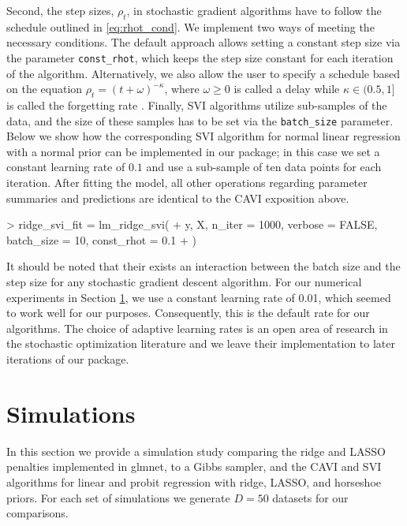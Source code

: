\documentclass[]{article}
\let\code=\texttt
\newenvironment{CodeChunk}{}{}
\newcommand{\pkg}[1]{{\fontseries{b}\selectfont #1}}
\begin{document}
Second, the step sizes, $\rho_t$, in stochastic gradient algorithms have to
follow the schedule outlined in \eqref{eq:rhot_cond}. We implement two ways of
meeting the necessary conditions. The default approach allows setting a constant
step size via the parameter \code{const\_rhot}, which keeps the step size
constant for each iteration of the algorithm. Alternatively, we also allow the
user to specify a schedule based on the equation $\rho_t = (t +
\omega)^{-\kappa}$, where $\omega \geq 0$ is called a delay while $\kappa \in
(0.5,  1]$ is called the forgetting rate \citep{hoffman2013svi}. Finally, SVI
algorithms utilize sub-samples of the data, and the size of these samples has to
be set via the \code{batch\_size} parameter.  Below we show how the
corresponding SVI algorithm for normal linear regression with a normal prior can
be implemented in our package; in this case we set a constant learning rate of
$0.1$ and use a sub-sample of ten data points for each iteration. After fitting
the model, all other operations regarding parameter summaries and predictions
are identical to the CAVI exposition above. 
\begin{CodeChunk}
\begin{CodeInput}
> ridge_svi_fit = lm_ridge_svi(
+   y, X, n_iter = 1000, verbose = FALSE, batch_size = 10, const_rhot = 0.1
+ )
\end{CodeInput}
\end{CodeChunk}

It should be noted that their exists an interaction between the batch size and
the step size for any stochastic gradient descent algorithm. For our numerical
experiments in Section \ref{sec:vir:simulations}, we use a constant learning
rate of 0.01, which seemed to work well for our purposes. Consequently, this is
the default rate for our algorithms. The choice of adaptive learning rates is an
open area of research in the stochastic optimization literature
\citep{nopeskylr, kingma2014adam} and we leave their implementation to later
iterations of our package. 

\section{Simulations} \label{sec:vir:simulations}

In this section we provide a simulation study comparing the ridge and LASSO
penalties implemented in \pkg{glmnet}, to a Gibbs sampler, and the CAVI and SVI
algorithms for linear and probit regression with ridge, LASSO, and horseshoe
priors. For each set of simulations we generate $D = 50$ datasets for our
comparisons.
\end{document}
